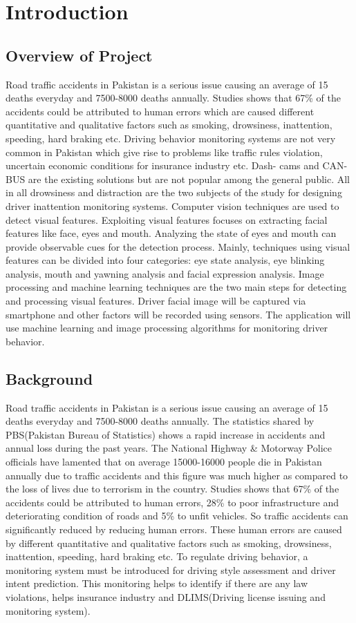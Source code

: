 \chapter{Introduction}

\section{Overview of Project}
Road traffic accidents in Pakistan is a serious issue causing an average of
15 deaths everyday and 7500-8000 deaths annually. Studies shows that 67\%
of the accidents could be attributed to human errors which are caused
different quantitative and qualitative factors such as smoking, drowsiness,
inattention, speeding, hard braking etc. Driving behavior monitoring systems
are not very common in Pakistan which give rise to problems like traffic rules
violation, uncertain economic conditions for insurance industry etc. Dash-
cams and CAN-BUS are the existing solutions but are not popular among the
general public. All in all drowsiness and distraction are the two subjects of the
study for designing driver inattention monitoring systems. Computer vision
techniques are used to detect visual features. Exploiting visual features
focuses on extracting facial features like face, eyes and mouth. Analyzing the
state of eyes and mouth can provide observable cues for the detection
process. Mainly, techniques using visual features can be divided into four
categories: eye state analysis, eye blinking analysis, mouth and yawning
analysis and facial expression analysis. Image processing and machine
learning techniques are the two main steps for detecting and processing
visual features. Driver facial image will be captured via smartphone and other
factors will be recorded using sensors. The application will use machine
learning and image processing algorithms for monitoring driver behavior.


\section{Background}


Road traffic accidents in Pakistan is a serious issue causing an average of 15
deaths everyday and 7500-8000 deaths annually. The statistics shared by
PBS(Pakistan Bureau of Statistics) shows a rapid increase in accidents and
annual loss during the past years. The National Highway \& Motorway Police
officials have lamented that on average 15000-16000 people die in Pakistan
annually due to traffic accidents and this figure was much higher as compared
to the loss of lives due to terrorism in the country. Studies shows that 67\% of
the accidents could be attributed to human errors, 28\% to poor infrastructure
and deteriorating condition of roads and 5\% to unfit vehicles.
So traffic accidents can significantly reduced by reducing human errors.
These human errors are caused by different quantitative and qualitative
factors such as smoking, drowsiness, inattention, speeding, hard braking etc.
To regulate driving behavior, a monitoring system must be introduced for
driving style assessment and driver intent prediction. This monitoring helps to
identify if there are any law violations, helps insurance industry and
DLIMS(Driving license issuing and monitoring system).

